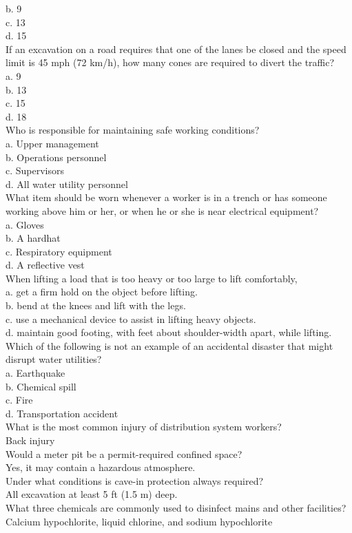 b.	9\\
c.	13\\
d.	15\\
If an excavation on a road requires that one of the lanes be closed and the speed limit is 45 mph (72 km/h), how many cones are required to divert the traffic?\\
a.	9\\
b.	13\\
c.	15\\
d.	18\\
Who is responsible for maintaining safe working conditions?\\
a.	Upper management\\
b.	Operations personnel\\
c.	Supervisors\\
d.	All water utility personnel\\
What item should be worn whenever a worker is in a trench or has someone working above him or	her, or when he or she is near electrical equipment?\\
a.	Gloves\\
b.	A hardhat\\
c.	Respiratory equipment\\
d.	A reflective vest\\
When lifting a load that is too heavy or too large to lift comfortably,\\
a.	get a firm hold on the object before lifting.\\
b.	bend at the knees and lift with the legs.\\
c.	use a mechanical device to assist in lifting heavy objects.\\
d.	maintain good footing, with feet about shoulder-width apart, while lifting.\\
Which of the following is not an example of an accidental disaster that might disrupt water utilities?\\
a.	Earthquake\\
b.	Chemical spill\\
c.	Fire\\
d.	Transportation accident\\
What is the most common injury of distribution system workers?\\
Back injury\\
Would a meter pit be a permit-required confined space?\\
Yes, it may contain a hazardous atmosphere.\\
Under what conditions is cave-in protection always required?\\
All excavation at least 5 ft (1.5 m) deep.\\
What three chemicals are commonly used to disinfect mains and other facilities?\\
Calcium hypochlorite, liquid chlorine, and sodium hypochlorite\\

